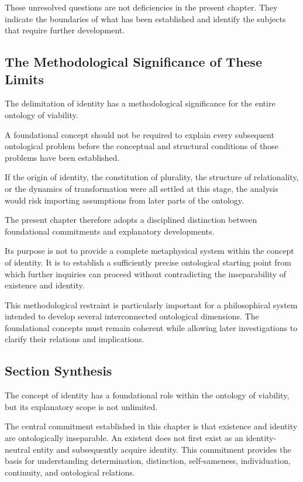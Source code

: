 These unresolved questions are not deficiencies in the present chapter. They indicate the boundaries of what has been established and identify the subjects that require further development.

\subsection{The Methodological Significance of These Limits}

The delimitation of identity has a methodological significance for the entire ontology of viability.

A foundational concept should not be required to explain every subsequent ontological problem before the conceptual and structural conditions of those problems have been established.

If the origin of identity, the constitution of plurality, the structure of relationality, or the dynamics of transformation were all settled at this stage, the analysis would risk importing assumptions from later parts of the ontology.

The present chapter therefore adopts a disciplined distinction between foundational commitments and explanatory developments.

Its purpose is not to provide a complete metaphysical system within the concept of identity. It is to establish a sufficiently precise ontological starting point from which further inquiries can proceed without contradicting the inseparability of existence and identity.

This methodological restraint is particularly important for a philosophical system intended to develop several interconnected ontological dimensions. The foundational concepts must remain coherent while allowing later investigations to clarify their relations and implications.

\subsection{Section Synthesis}

The concept of identity has a foundational role within the ontology of viability, but its explanatory scope is not unlimited.

The central commitment established in this chapter is that existence and identity are ontologically inseparable. An existent does not first exist as an identity-neutral entity and subsequently acquire identity. This commitment provides the basis for understanding determination, distinction, self-sameness, individuation, continuity, and ontological relations.

